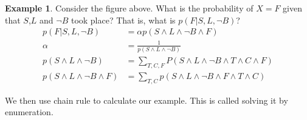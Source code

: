 \documentclass[a4paper]{article}
\theoremstyle{plain}
\theoremstyle{definition}
\newtheorem{exmp}{Example}[section]
\theoremstyle{remark}
\begin{document}
\begin{exmp}
	Consider the figure above. What is the probability of $X=F$ given that $S$,$L$ and $\neg B$ took place? That is, what is $p(F|S,L,\neg B)$? 
	\begin{align*}
		p(F|S,L,\neg B) &= \alpha p(S \land L \land \neg B \land F) \\
		\alpha &= \frac{1}{p(S \land L \land \neg B)}\\
		p(S \land L \land \neg B ) &= \sum_{T,C,F}^{} P(S \land L \land \neg B \land T \land C \land F)\\
		p(S \land L \land \neg B \land F) &= \sum_{T,C}^{} p(S \land L \land \neg B \land F \land T \land C)
	\end{align*}
\end{exmp}
We then use chain rule to calculate our example. This is called solving it by enumeration.
\end{document}
